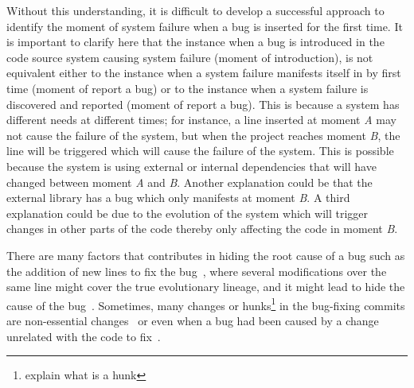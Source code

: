 \documentclass[a4paper, 12pt]{book}
\begin{document}
Without this understanding, it is difficult to develop a successful approach to identify the moment of system failure when a bug is inserted for the first time. It is important to clarify here that the instance when a bug is introduced in the code source system causing system failure (moment of introduction), is not equivalent either to the instance when a system failure manifests itself in by first time (moment of report a bug) or to the instance when a system failure is discovered and reported (moment of report a bug). This is because a system has different needs at different times; for instance, a line inserted at moment \emph{A} may not cause the failure of the system, but when the project reaches moment \emph{B}, the line will be triggered which will cause the failure of the system. This is possible because the system is using external or internal dependencies that will have changed between moment \emph{A} and \emph{B}. Another explanation could be that the external library has a bug which only manifests at moment \emph{B}. A third explanation could be due to the evolution of the system which will trigger changes in other parts of the code thereby only affecting the code in moment \emph{B}. 



There are many factors that contributes in hiding the root cause of a bug such as the addition of new lines to fix the bug~\cite{da2016framework}, where several modifications over the same line might cover the true evolutionary lineage, and it might lead to hide the cause of the bug~\cite{servant2017fuzzy}. Sometimes, many changes or hunks\footnote{explain what is a hunk} in the bug-fixing commits are non-essential changes~\cite{herzig2013impact} or even when a bug had been caused by a change unrelated with the code to fix~\cite{german2009change}. %
\end{document}

